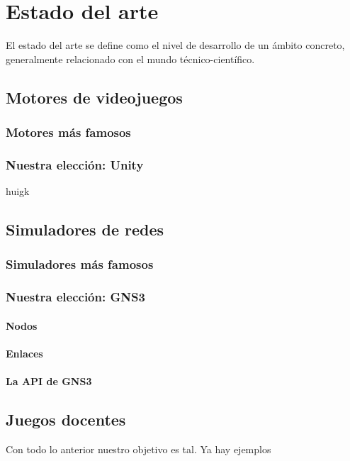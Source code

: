 \chapter{Estado del arte}\label{chap:ArtState}

El estado del arte se define como el nivel de desarrollo de un ámbito concreto, generalmente relacionado con el mundo técnico-científico.

\section{Motores de videojuegos}

\subsection{Motores más famosos}

\subsection{Nuestra elección: Unity}

huigk

\section{Simuladores de redes}

\subsection{Simuladores más famosos}

\subsection{Nuestra elección: GNS3}

\subsubsection{Nodos}

\subsubsection{Enlaces}

\subsubsection{La API de GNS3}



\section{Juegos docentes}

Con todo lo anterior nuestro objetivo es tal. Ya hay ejemplos